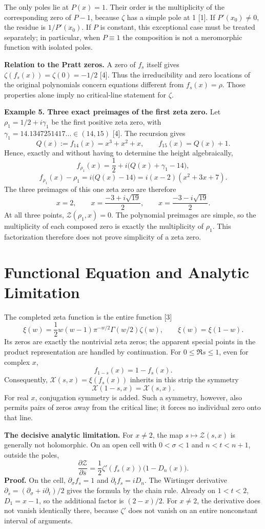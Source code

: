 \documentclass[11pt,a4paper]{article}
\newcommand{\Zcal}{\mathcal Z}
\newcommand{\Xcal}{\mathcal X}
\begin{document}
The only poles lie at $P(x)=1$. Their order is the multiplicity of the corresponding zero of $P-1$, because $\zeta$ has a simple pole at 1 [1]. If $P'(x_0)\ne0$, the residue is $1/P'(x_0)$. If $P$ is constant, this exceptional case must be treated separately; in particular, when $P\equiv1$ the composition is not a meromorphic function with isolated poles.

\textbf{Relation to the Pratt zeros.} A zero of $f_s$ itself gives $\zeta(f_s(x))=\zeta(0)=-1/2$ [4]. Thus the irreducibility and zero locations of the original polynomials concern equations different from $f_s(x)=\rho$. Those properties alone imply no critical-line statement for $\zeta$.

\textbf{Example 5. Three exact preimages of the first zeta zero.}
Let $\rho_1=1/2+i\gamma_1$ be the first positive zeta zero, with $\gamma_1=14.1347251417\ldots\in(14,15)$ [4]. The recursion gives
\[
 Q(x):=f_{14}(x)=x^3+x^2+x,\qquad f_{15}(x)=Q(x)+1.
\]
Hence, exactly and without having to determine the height algebraically,
\[
 f_{\rho_1}(x)=\frac12+i\bigl(Q(x)+\gamma_1-14\bigr),
\]
\[
 f_{\rho_1}(x)-\rho_1=i\bigl(Q(x)-14\bigr)
 =i(x-2)(x^2+3x+7).
\]
The three preimages of this one zeta zero are therefore
\[
 x=2,\qquad x=\frac{-3+i\sqrt{19}}2,\qquad x=\frac{-3-i\sqrt{19}}2.
\]
At all three points, $\Zcal(\rho_1,x)=0$. The polynomial preimages are simple, so the multiplicity of each composed zero is exactly the multiplicity of $\rho_1$. This factorization therefore does not prove simplicity of a zeta zero.

\section{Functional Equation and Analytic Limitation}
The completed zeta function is the entire function [3]
\[
 \xi(w)=\frac12 w(w-1)\pi^{-w/2}\Gamma(w/2)\zeta(w),\qquad
 \xi(w)=\xi(1-w).
\]
Its zeros are exactly the nontrivial zeta zeros; the apparent special points in the product representation are handled by continuation. For $0\le\Re s\le1$, even for complex $x$,
\[
 f_{1-s}(x)=1-f_s(x).
\]
Consequently, $\Xcal(s,x)=\xi(f_s(x))$ inherits in this strip the symmetry
\[
 \Xcal(1-s,x)=\Xcal(s,x).
\]
For real $x$, conjugation symmetry is added. Such a symmetry, however, also permits pairs of zeros away from the critical line; it forces no individual zero onto that line.

\textbf{The decisive analytic limitation.} For $x\ne2$, the map $s\mapsto\Zcal(s,x)$ is generally not holomorphic. On an open cell with $0<\sigma<1$ and $n<t<n+1$, outside the poles,
\[
 \frac{\partial\Zcal}{\partial\overline s}
 =\frac12\zeta'(f_s(x))\bigl(1-D_n(x)\bigr).
\]
\textbf{Proof.} On the cell, $\partial_\sigma f_s=1$ and $\partial_t f_s=iD_n$. The Wirtinger derivative $\partial_{\overline s}=(\partial_\sigma+i\partial_t)/2$ gives the formula by the chain rule. Already on $1<t<2$, $D_1=x-1$, so the additional factor is $(2-x)/2$. For $x\ne2$, the derivative does not vanish identically there, because $\zeta'$ does not vanish on an entire nonconstant interval of arguments.
\end{document}
